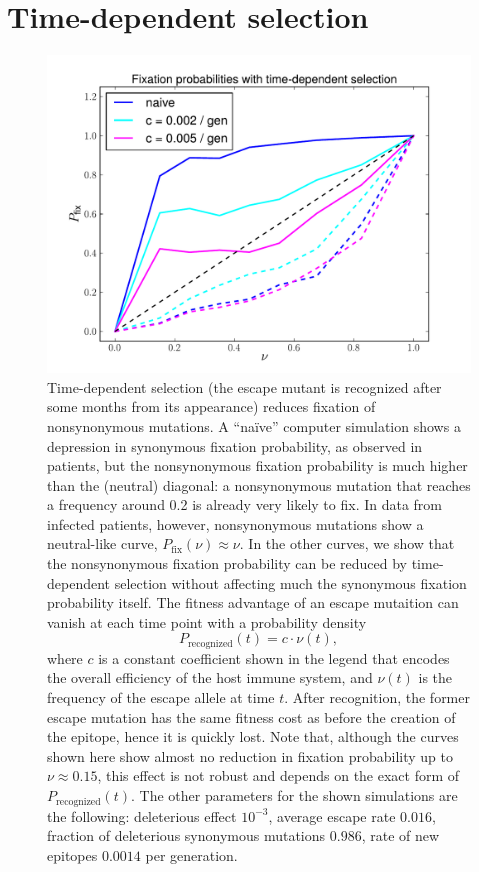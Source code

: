 \documentclass[rmp]{revtex4}
\begin{document}
\section{Time-dependent selection}
\begin{figure}[h]
\begin{center}
\includegraphics[width=0.6\linewidth]{simulations_gradually_timeselec_deadagain}
\caption{
Time-dependent selection (the escape mutant is recognized after some months from
its appearance) reduces fixation of nonsynonymous
mutations. A ``na\"ive'' computer simulation shows a depression in synonymous
fixation probability, as observed in patients, but the nonsynonymous fixation
probability is much higher than the (neutral) diagonal: a nonsynonymous mutation
that reaches a frequency around 0.2 is already very likely to fix. In data from
infected patients, however, nonsynonymous mutations show a neutral-like curve,
$P_\text{fix}(\nu) \approx \nu$. In the other curves, we show that the
nonsynonymous fixation probability can be reduced by time-dependent selection
without affecting much the synonymous fixation probability itself. The fitness
advantage of an escape mutaition can vanish at each time point with a
probability density \[ P_\text{recognized}(t) = c \cdot \nu(t), \] where $c$ is
a constant coefficient shown in the legend that encodes the overall efficiency
of the host immune system, and $\nu(t)$ is the frequency of the escape allele at
time $t$. After recognition, the former escape mutation has the same fitness
cost as before the creation of the epitope, hence it is quickly lost. Note that,
although the curves shown here show almost no reduction in fixation probability
up to $\nu \approx 0.15$, this effect is not robust and depends on the exact form of
$ P_\text{recognized}(t)$. The other parameters for the shown simulations are
the following: deleterious effect $10^{-3}$, average escape rate $0.016$,
fraction of deleterious synonymous mutations $0.986$, rate of new epitopes
$0.0014$ per generation.
}
\label{fig:tds}
\end{center}
\end{figure}
\end{document}

